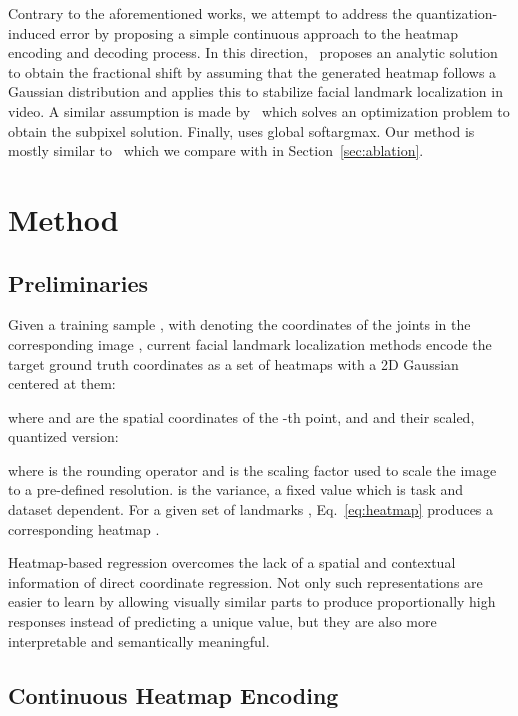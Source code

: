 \documentclass{bmvc2k}
\begin{document}
Contrary to the aforementioned works, we attempt to address the quantization-induced error by proposing a simple continuous approach to the heatmap encoding and decoding process. In this direction,~\cite{tai2019towards} proposes an analytic solution to obtain the fractional shift by assuming that the generated heatmap follows a Gaussian distribution and applies this to stabilize facial landmark localization in video. A similar assumption is made by~\cite{wan2020robust} which solves an optimization problem to obtain the subpixel solution. Finally, \cite{luvizon20182d} uses global softargmax. Our method is mostly similar to~\cite{luvizon20182d} which we compare with in Section~\ref{sec:ablation}.



\section{Method}\label{sec:method}

\subsection{Preliminaries}\label{ssec:preliminaries}

Given a training sample , with  denoting the coordinates of the  joints in the corresponding image , current facial landmark localization methods encode the target ground truth coordinates as a set of  heatmaps with a 2D Gaussian centered at them:

where  and  are the spatial coordinates of the -th point, and  and  their scaled, quantized version:


where  is the rounding operator and  is the scaling factor used to scale the image to a pre-defined resolution.  is the variance, a fixed value which is task and dataset dependent. For a given set of landmarks , Eq.~\ref{eq:heatmap} produces a corresponding heatmap .

Heatmap-based regression overcomes the lack of a spatial and contextual information of direct coordinate regression. Not only such representations are easier to learn by allowing visually similar parts to produce proportionally high responses instead of predicting a unique value, but they are also more interpretable and semantically meaningful.


\subsection{Continuous Heatmap Encoding}\label{ssec:heatmap-encoding}
\end{document}
